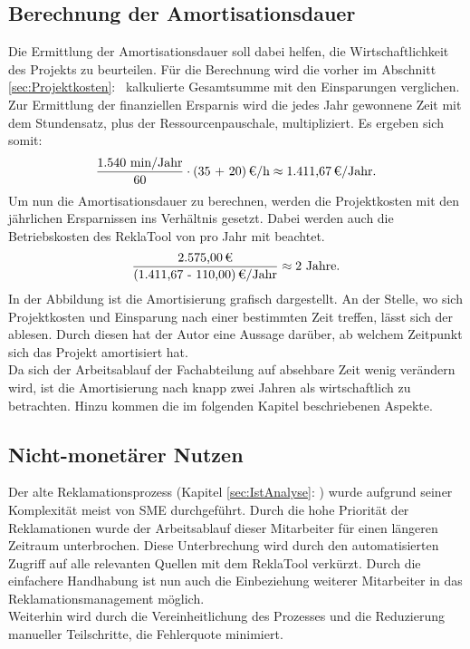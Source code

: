 \subsection*{Berechnung der Amortisationsdauer}
Die Ermittlung der Amortisationsdauer soll dabei helfen, die Wirtschaftlichkeit des Projekts zu beurteilen.
Für die Berechnung wird die vorher im Abschnitt  \ref{sec:Projektkosten}:~ kalkulierte Gesamtsumme 
mit den Einsparungen verglichen. 
Zur Ermittlung der finanziellen Ersparnis wird die jedes Jahr gewonnene Zeit mit dem Stundensatz, plus der Ressourcenpauschale,
multipliziert. Es ergeben sich somit:
\begin{eqnarray}
    \frac{1.540 \mbox{ min/Jahr}}{60} \cdot \eur{(35 + 20)}\mbox{/h} \approx \eur{1.411,67}\mbox{/Jahr}. 
\end{eqnarray}
Um nun die Amortisationsdauer zu berechnen, werden die Projektkosten mit den jährlichen Ersparnissen ins Verhältnis gesetzt.
Dabei werden auch die Betriebskosten des ReklaTool von  pro Jahr mit beachtet.
\begin{eqnarray}
    \frac{\eur{2.575,00}}{\eur{(1.411,67 - 110,00)}\mbox{/Jahr}} \approx 2 \mbox{ Jahre}.	
\end{eqnarray}
In der Abbildung  ist die Amortisierung grafisch dargestellt.
An der Stelle, wo sich Projektkosten und Einsparung nach einer bestimmten Zeit treffen, lässt sich der
 ablesen. Durch diesen hat der Autor eine Aussage darüber, ab welchem Zeitpunkt sich das Projekt amortisiert hat.\\
Da sich der Arbeitsablauf der Fachabteilung auf absehbare Zeit wenig verändern wird, ist die Amortisierung nach knapp zwei
Jahren als wirtschaftlich zu betrachten. Hinzu kommen die im folgenden Kapitel beschriebenen Aspekte.

\subsection{Nicht-monetärer Nutzen}
\label{sec:nichtMonetaererNutzen}
Der alte Reklamationsprozess (\Vgl Kapitel \ref{sec:IstAnalyse}: ) wurde aufgrund seiner Komplexität
meist von \ac{SME} durchgeführt. Durch die hohe Priorität der Reklamationen wurde der Arbeitsablauf dieser Mitarbeiter für 
einen längeren Zeitraum unterbrochen. Diese Unterbrechung wird durch den automatisierten Zugriff auf alle relevanten Quellen mit 
dem ReklaTool verkürzt. Durch die einfachere Handhabung ist nun auch die Einbeziehung weiterer Mitarbeiter in das 
Reklamationsmanagement möglich.\\
Weiterhin wird durch die Vereinheitlichung des Prozesses und die Reduzierung manueller Teilschritte, 
die Fehlerquote minimiert. 

